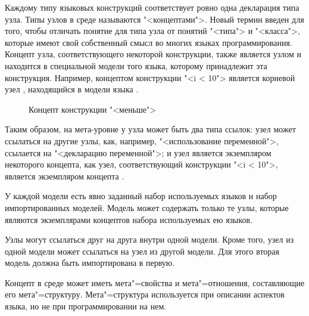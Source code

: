 Каждому типу языковых конструкций соответствует ровно одна декларация типа узла. Типы узлов в среде \MPS{} называются "<концептами">. Новый термин введен для того, чтобы отличать понятие для типа узла от понятий "<типа"> и "<класса">, которые имеют свой собственный смысл во многих языках программирования. Концепт узла, соответствующего некоторой конструкции, также является узлом и находится в специальной модели того языка, которому принадлежит эта конструкция. Например, концептом конструкции "<i < 10"> является корневой узел , находящийся в модели  языка  \pic{\ref{fig:LessThenExpressionConcept}}.

\begin{figure}
 \centering
 \caption{Концепт конструкции "<меньше">}
 \label{fig:LessThenExpressionConcept}
\end{figure}


Таким образом, на мета-уровне у узла может быть два типа ссылок: узел может ссылаться на другие узлы, как, например, "<использование переменной">, ссылается на "<декларацию переменной">; и узел является экземпляром некоторого концепта, как узел, соответствующий конструкции "<i < 10">, является экземпляром концепта .

У каждой модели есть явно заданный набор используемых языков и набор импортированных моделей. Модель может содержать только те узлы, которые являются экземплярами концептов набора используемых ею языков.

Узлы могут ссылаться друг на друга внутри одной модели. Кроме того, узел из одной модели может ссылаться на узел из другой модели. Для этого вторая модель должна быть импортирована в первую.

Концепт в среде \MPS{} может иметь мета"=свойства и мета"=отношения, составляющие его мета"=структуру. Мета"=структура используется при описании аспектов языка, но не при программировании на нем.
